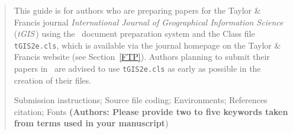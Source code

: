 \documentclass[]{tGIS2e}
\begin{document}
\begin{abstract}
This guide is for authors who are preparing papers for the Taylor \& Francis journal {\em International Journal of Geographical Information Science} ({\it tGIS}\,) using the \LaTeXe\ document preparation system and the Class file {\tt tGIS2e.cls}, which
is available via the journal homepage on the Taylor \& Francis website (see Section~\ref{FTP}). Authors planning
to submit their papers in \LaTeXe\ are advised to use {\tt tGIS2e.cls} as early as possible in the creation of
their files.\bigskip

\begin{keywords}Submission instructions; Source file coding;
Environments; References citation; Fonts {\bf{(Authors: Please provide two to five keywords taken
from terms used in your manuscript}})
\end{keywords}\bigskip

\newpage


\end{abstract}
\end{document}
